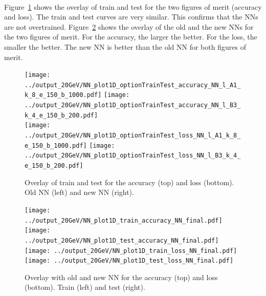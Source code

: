 \ \\Figure~\ref{fig:accuracylossTrainTest} shows the overlay of train and test for the two figures of merit (accuracy and loss). The train and test curves are very similar. This confirms that the NNs are not overtrained. Figure~\ref{fig:accuracylossOldNew} shows the overlay of the old and the new NNs for the two figures of merit. For the accuracy, the larger the better. For the loss, the smaller the better. The new NN is better than the old NN for both figures of merit. 

\begin{figure}[t]
  \centering
  \texttt{[image: ../output\_20GeV/NN\_plot1D\_optionTrainTest\_accuracy\_NN\_l\_A1\_k\_8\_e\_150\_b\_1000.pdf]}
  \texttt{[image: ../output\_20GeV/NN\_plot1D\_optionTrainTest\_accuracy\_NN\_l\_B3\_k\_4\_e\_150\_b\_200.pdf]}\\
  \texttt{[image: ../output\_20GeV/NN\_plot1D\_optionTrainTest\_loss\_NN\_l\_A1\_k\_8\_e\_150\_b\_1000.pdf]}
  \texttt{[image: ../output\_20GeV/NN\_plot1D\_optionTrainTest\_loss\_NN\_l\_B3\_k\_4\_e\_150\_b\_200.pdf]}
  \caption{Overlay of train and test for the accuracy (top) and loss (bottom). Old NN (left) and new NN (right).}
  \label{fig:accuracylossTrainTest}
\end{figure}

\begin{figure}[b]
  \centering
  \texttt{[image: ../output\_20GeV/NN\_plot1D\_train\_accuracy\_NN\_final.pdf]}
  \texttt{[image: ../output\_20GeV/NN\_plot1D\_test\_accuracy\_NN\_final.pdf]}\\
  \texttt{[image: ../output\_20GeV/NN\_plot1D\_train\_loss\_NN\_final.pdf]}
  \texttt{[image: ../output\_20GeV/NN\_plot1D\_test\_loss\_NN\_final.pdf]}
  \caption{Overlay with old and new NN for the accuracy (top) and loss (bottom). Train (left) and test (right).}
  \label{fig:accuracylossOldNew}
\end{figure}
